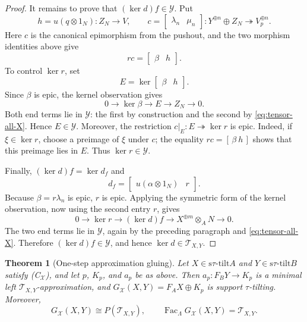 \documentclass[11pt,reqno]{amsart}
\newtheorem{theorem}{Theorem}[section]
\theoremstyle{definition}
\theoremstyle{remark}
\newcommand{\Fac}{\operatorname{Fac}}
\newcommand{\stau}{\mathrm{s}\tau\text{-}\mathrm{tilt}}
\numberwithin{equation}{section}
\begin{document}
\begin{proof}
It remains to prove that $(\ker d)f\in\mathcal Y$.  Put
\[
 h=u(q\otimes1_N):Z_N\longrightarrow V,
 \qquad
 c=\begin{bmatrix}\lambda_n&\mu_n\end{bmatrix}:
 Y^{\oplus n}\oplus Z_N\twoheadrightarrow V_p^{\oplus n}.
\]
Here $c$ is the canonical epimorphism from the pushout, and the two morphism
identities above give
\[
 rc=\begin{bmatrix}\beta&h\end{bmatrix}.
\]
To control $\ker r$, set
\[
 E=\ker\begin{bmatrix}\beta&h\end{bmatrix}.
\]
Since $\beta$ is epic, the kernel observation gives
\[
 0\longrightarrow\ker\beta\longrightarrow E
 \longrightarrow Z_N\longrightarrow0.
\]
Both end terms lie in $\mathcal Y$: the first by construction and the second
by \eqref{eq:tensor-all-X}.  Hence $E\in\mathcal Y$.  Moreover, the
restriction $c|_E:E\twoheadrightarrow\ker r$ is epic.  Indeed, if
$\xi\in\ker r$, choose a preimage of $\xi$ under $c$; the equality
$rc=[\,\beta\ h\,]$ shows that this preimage lies in $E$.  Thus
$\ker r\in\mathcal Y$.

Finally, $(\ker d)f=\ker d_f$ and
\[
 d_f=\begin{bmatrix}u(\alpha\otimes1_N)&r\end{bmatrix}.
\]
Because $\beta=r\lambda_n$ is epic, $r$ is epic.  Applying the symmetric
form of the kernel observation, now using the second entry $r$, gives
\[
 0\longrightarrow\ker r\longrightarrow(\ker d)f
 \longrightarrow X^{\oplus m}\otimes_AN\longrightarrow0.
\]
The two end terms lie in $\mathcal Y$, again by the preceding paragraph and
\eqref{eq:tensor-all-X}.  Therefore $(\ker d)f\in\mathcal Y$, and hence
$\ker d\in\mathcal T_{X,Y}$.
\end{proof}

\begin{theorem}[One-step approximation gluing]\label{thm:main}
Let $X\in\stau A$ and $Y\in\stau B$ satisfy
\textup{(C$_{\mathcal X}$)}, and let $p$, $K_p$, and $a_p$ be as above.
Then $a_p:F_BY\to K_p$ is a minimal left
$\mathcal T_{X,Y}$-approximation, and
$G_{\mathcal X}(X,Y)=F_AX\oplus K_p$ is support $\tau$-tilting.  Moreover,
\[
 G_{\mathcal X}(X,Y)\cong P(\mathcal T_{X,Y}),
 \qquad
 \Fac_\Lambda G_{\mathcal X}(X,Y)=\mathcal T_{X,Y}.
\]
\end{theorem}
\end{document}
